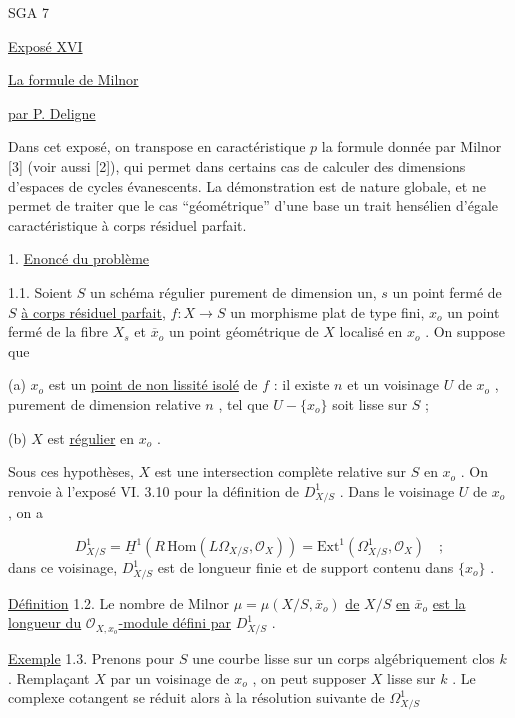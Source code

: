 


SGA 7


\underline{Exposé XVI}


\underline{La formule de Milnor}


\underline{par P. Deligne}

Dans cet exposé, on transpose en caractéristique $p$ la formule donnée par Milnor [3] (voir aussi [2]), qui permet dans certains cas de calculer des dimensions d'espaces de cycles évanescents. La démonstration est de nature globale, et ne permet de traiter que le cas ``géométrique'' d'une base un trait hensélien d'égale caractéristique à corps résiduel parfait.


1. \underline{Enoncé du problème}

1.1. Soient $S$ un schéma régulier purement de dimension un, $s$ un point fermé de $S$ \underline{à corps résiduel parfait}, $f : X \to S$ un morphisme plat de type fini, $x_o$ un point fermé de la fibre $X_s$ et $\overline{x}_o$ un point géométrique de $X$ localisé en $x_o$ . On suppose que

(a) $x_o$ est un \underline{point de non lissité isolé} de $f$ : il existe $n$ et un voisinage $U$ de $x_o$ , purement de dimension relative $n$ , tel que $U - \{x_o\}$ soit lisse sur $S$ ;

(b) $X$ est \underline{régulier} en $x_o$ .

Sous ces hypothèses, $X$ est une intersection complète relative sur $S$ en $x_o$ . On renvoie à l'exposé VI. 3.10 pour la définition de $D^1_{X/S}$ . Dans le voisinage $U$ de $x_o$ , on a

\begin{equation*}
D^1_{X/S} = \underline{H}^1(R\,\mathrm{Hom}(L\Omega_{X/S},\mathcal{O}_X)) = \mathrm{Ext}^1(\Omega^1_{X/S},\mathcal{O}_X) \quad ;
\end{equation*}
dans ce voisinage, $D^1_{X/S}$ est de longueur finie et de support contenu dans $\{x_o\}$ .



\underline{Définition} 1.2. Le nombre de Milnor $\mu = \mu(X/S,\bar{x}_o)$ \underline{de} $X/S$ \underline{en} $\bar{x}_o$ \underline{est la longueur du} $\mathcal{O}_{X,x_o}$\underline{-module défini par} $D^1_{X/S}$ .

\underline{Exemple} 1.3. Prenons pour $S$ une courbe lisse sur un corps algébriquement clos $k$ . Remplaçant $X$ par un voisinage de $x_o$ , on peut supposer $X$ lisse sur $k$ . Le complexe cotangent se réduit alors à la résolution suivante de $\Omega^1_{X/S}$

